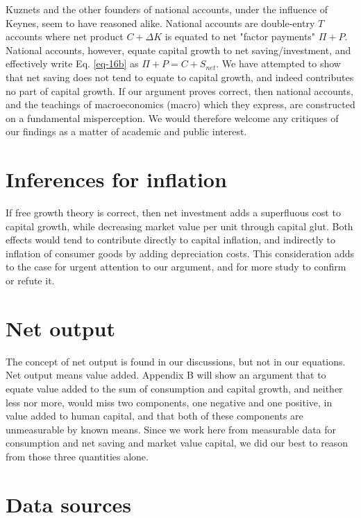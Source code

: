 \documentclass[a4paper,fleqn]{latex_styles/cas-sc}
\begin{document}
    Kuznets and the other founders of national accounts, under the influence of Keynes, seem to have reasoned alike. National accounts are double-entry \(T\) accounts where net product \(C + \Delta K\) is equated to net "factor payments" \(\Pi + P\). National accounts, however, equate capital growth to net saving/investment, and effectively write Eq. \eqref{eq-16b} as \(\Pi + P = C + S_{net}\). We have attempted to show that net saving does not tend to equate to capital growth, and indeed contributes no part of capital growth. If our argument proves correct, then national accounts, and the teachings of macroeconomics (macro) which they express, are constructed on a fundamental misperception. We would therefore welcome any critiques of our findings as a matter of academic and public interest.

\section{Inferences for inflation}

If free growth theory is correct, then net investment adds a superfluous cost to capital growth, while decreasing market value per unit through capital glut. Both effects would tend to contribute directly to capital inflation, and indirectly to inflation of consumer goods by adding depreciation costs. This consideration adds to the case for urgent attention to our argument, and for more study to confirm or refute it.

\hypertarget{net-output}{
\section{Net output}\label{net-output}
}
The concept of net output is found in our discussions, but not in our equations. Net output means value added. Appendix B will show an argument that to equate value added to the sum of consumption and capital growth, and neither less nor more, would miss two components, one negative and one positive, in value added to human capital, and that both of these components are unmeasurable by known means. Since we work here from measurable data for consumption and net saving and market value capital, we did our best to reason from those three quantities alone.
%



\hypertarget{data-sources}{%
\section{Data sources}\label{data-sources}}
\end{document}
